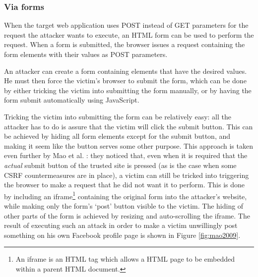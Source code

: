 \subsubsection{Via forms}\label{forms}

When the target web application uses POST instead of GET parameters for the request the attacker wants to execute, an HTML form can be used to perform the request. When a form is submitted, the browser issues a request containing the form elements with their values as POST parameters.

An attacker can create a form containing elements that have the desired values. He must then force the victim's browser to submit the form, which can be done by either tricking the victim into submitting the form manually, or by having the form submit automatically using JavaScript.

Tricking the victim into submitting the form can be relatively easy: all the attacker has to do is assure that the victim will click the submit button. This can be achieved by hiding all form elements except for the submit button, and making it seem like the button serves some other purpose. This approach is taken even further by Mao et al. \cite{Mao2009}: they noticed that, even when it is required that the \emph{actual} submit button of the trusted site is pressed (as is the case when some CSRF countermeasures \cite{Jovanovic2006,Johns2006} are in place), a victim can still be tricked into triggering the browser to make a request that he did not want it to perform. This is done by including an iframe\footnote{An iframe is an HTML tag which allows a HTML page to be embedded within a parent HTML document.} containing the original form into the attacker's website, while making only the form's `post' button visible to the victim. The hiding of other parts of the form is achieved by resizing and auto-scrolling the iframe. The result of executing such an attack in order to make a victim unwillingly post something on his own Facebook profile page is shown in Figure \ref{fig:mao2009}.

